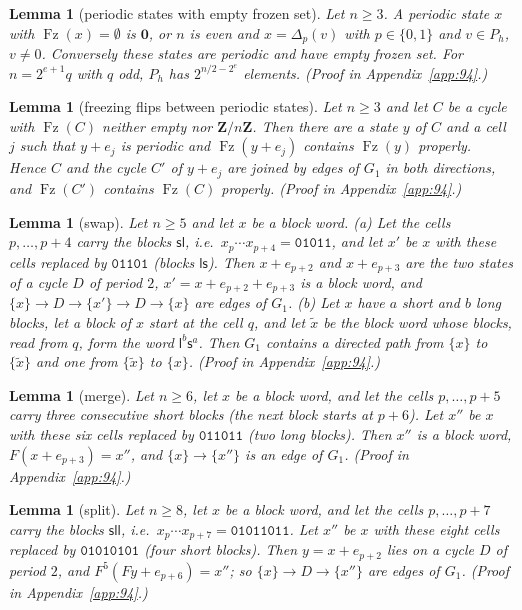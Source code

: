 \documentclass[10pt,a4paper]{article}
\newtheorem{lemma}[theorem]{Lemma}
\newcommand{\Zn}{\mathbf{Z}/n\mathbf{Z}}      %
\newcommand{\zero}{\mathbf{0}}                %
\newcommand{\Gone}{G_1}                       %
\newcommand{\code}[1]{\mathtt{#1}}            %
\newcommand{\Fz}{\operatorname{Fz}}           %
\begin{document}
\begin{lemma}[periodic states with empty frozen set]\label{94:lem:empty}
Let $n\ge3$. A periodic state $x$ with $\Fz(x)=\emptyset$ is $\zero$, or $n$ is even and $x=\Delta_p(v)$ with
$p\in\{0,1\}$ and $v\in P_h$, $v\ne0$. Conversely these states are periodic and have empty frozen set. For
$n=2^{e+1}q$ with $q$ odd, $P_h$ has $2^{n/2-2^e}$ elements. (Proof in Appendix~\ref{app:94}.)
\end{lemma}

\begin{lemma}[freezing flips between periodic states]\label{94:lem:refreeze}
Let $n\ge3$ and let $C$ be a cycle with $\Fz(C)$ neither empty nor $\Zn$. Then there are a state $y$ of $C$ and a
cell $j$ such that $y+e_j$ is periodic and $\Fz(y+e_j)$ contains $\Fz(y)$ properly. Hence $C$ and the cycle $C'$
of $y+e_j$ are joined by edges of $\Gone$ in both directions, and $\Fz(C')$ contains $\Fz(C)$ properly.
(Proof in Appendix~\ref{app:94}.)
\end{lemma}

\begin{lemma}[swap]\label{94:lem:swap}
Let $n\ge5$ and let $x$ be a block word.
\textup{(a)} Let the cells $p,\dots,p+4$ carry the blocks $\mathsf{s}\mathsf{l}$, i.e.\
$x_p\cdots x_{p+4}=\code{01011}$, and let $x'$ be $x$ with these cells replaced by $\code{01101}$ (blocks
$\mathsf{l}\mathsf{s}$). Then $x+e_{p+2}$ and $x+e_{p+3}$ are the two states of a cycle $D$ of period $2$,
$x'=x+e_{p+2}+e_{p+3}$ is a block word, and $\{x\}\to D\to\{x'\}\to D\to\{x\}$ are edges of $\Gone$.
\textup{(b)} Let $x$ have $a$ short and $b$ long blocks, let a block of $x$ start at the cell $q$, and let $\tilde x$ be
the block word whose blocks, read from $q$, form the word $\mathsf{l}^b\mathsf{s}^a$. Then $\Gone$ contains a
directed path from $\{x\}$ to $\{\tilde x\}$ and one from $\{\tilde x\}$ to $\{x\}$. (Proof in Appendix~\ref{app:94}.)
\end{lemma}

\begin{lemma}[merge]\label{94:lem:merge}
Let $n\ge6$, let $x$ be a block word, and let the cells $p,\dots,p+5$ carry three consecutive short blocks (the
next block starts at $p+6$). Let $x''$ be $x$ with these six cells replaced by $\code{011011}$ (two long blocks).
Then $x''$ is a block word, $F(x+e_{p+3})=x''$, and $\{x\}\to\{x''\}$ is an edge of $\Gone$.
(Proof in Appendix~\ref{app:94}.)
\end{lemma}

\begin{lemma}[split]\label{94:lem:split}
Let $n\ge8$, let $x$ be a block word, and let the cells $p,\dots,p+7$ carry the blocks $\mathsf{sll}$, i.e.\
$x_p\cdots x_{p+7}=\code{01011011}$. Let $x''$ be $x$ with these eight cells replaced by $\code{01010101}$ (four
short blocks). Then $y=x+e_{p+2}$ lies on a cycle $D$ of period $2$, and $F^5(Fy+e_{p+6})=x''$; so
$\{x\}\to D\to\{x''\}$ are edges of $\Gone$. (Proof in Appendix~\ref{app:94}.)
\end{lemma}
\end{document}
